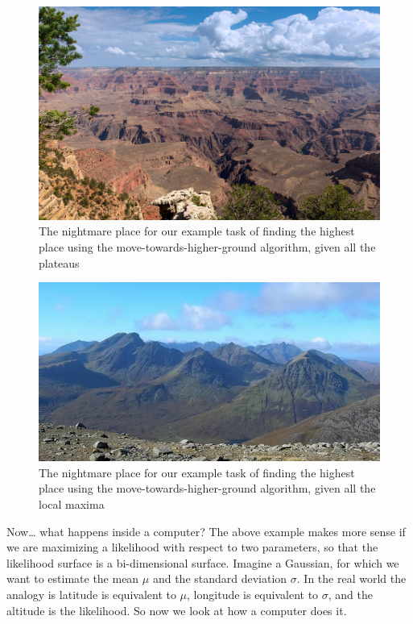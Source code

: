 \documentclass[
]{book}
\begin{document}
\begin{figure}
\centering
\includegraphics{extfiles/grand-canyon.jpg}
\caption{The nightmare place for our example task of finding the highest place using the move-towards-higher-ground algorithm, given all the plateaus}
\end{figure}

\begin{figure}
\centering
\includegraphics{extfiles/munros.jpg}
\caption{The nightmare place for our example task of finding the highest place using the move-towards-higher-ground algorithm, given all the local maxima}
\end{figure}

Now\ldots{} what happens inside a computer? The above example makes more sense if we are maximizing a likelihood with respect to two parameters, so that the likelihood surface is a bi-dimensional surface. Imagine a Gaussian, for which we want to estimate the mean \(\mu\) and the standard deviation \(\sigma\). In the real world the analogy is latitude is equivalent to \(\mu\), longitude is equivalent to \(\sigma\), and the altitude is the likelihood. So now we look at how a computer does it.
\end{document}
